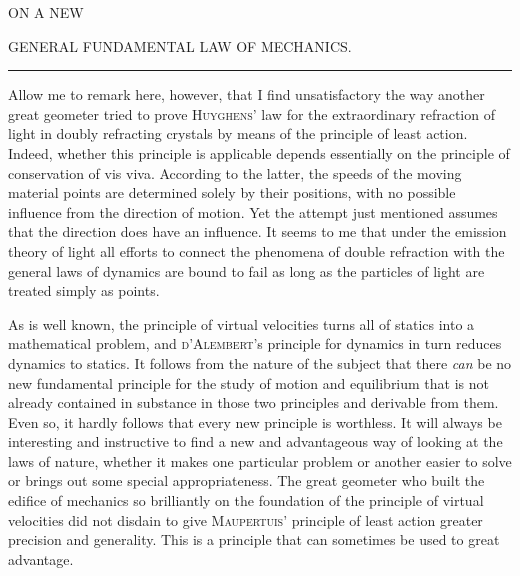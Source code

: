 \begin{center}
ON A NEW\par
\bigskip
GENERAL FUNDAMENTAL LAW OF MECHANICS.\par
\medskip
\rule{.16\textwidth}{.3pt}
\end{center}
\expandafter\def\csname HistoricalNoteText2\endcsname{Allow me to remark here, however, that I find unsatisfactory the way another great geometer tried to prove \textsc{Huyghens}’ law for the extraordinary refraction of light in doubly refracting crystals by means of the principle of least action. Indeed, whether this principle is applicable depends essentially on the principle of conservation of vis viva. According to the latter, the speeds of the moving material points are determined solely by their positions, with no possible influence from the direction of motion. Yet the attempt just mentioned assumes that the direction does have an influence. It seems to me that under the emission theory of light all efforts to connect the phenomena of double refraction with the general laws of dynamics are bound to fail as long as the particles of light are treated simply as points.}
\par
As is well known, the principle of virtual velocities turns all of statics into a mathematical problem, and \textsc{d’Alembert}’s principle for dynamics in turn reduces dynamics to statics. It follows from the nature of the subject that there \textit{can} be no new fundamental principle for the study of motion and equilibrium that is not already contained in substance in those two principles and derivable from them. Even so, it hardly follows that every new principle is worthless. It will always be interesting and instructive to find a new and advantageous way of looking at the laws of nature, whether it makes one particular problem or another easier to solve or brings out some special appropriateness. The great geometer who built the edifice of mechanics so brilliantly on the foundation of the principle of virtual velocities did not disdain to give \textsc{Maupertuis}’ principle of least action greater precision and generality. This is a principle that can sometimes be used to great advantage.

